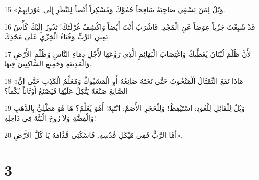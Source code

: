\par 15 «وَيْلٌ لِمَنْ يَسْقِي صَاحِبَهُ سَافِحاً حُمُوَّكَ وَمُسْكِراً أَيْضاً لِلنَّظَرِ إِلَى عَوْرَاتِهِمْ.
\par 16 قَدْ شَبِعْتَ خِزْياً عِوَضاً عَنِ الْمَجْدِ. فَاشْرَبْ أَنْتَ أَيْضاً وَاكْشِفْ غُرْلَتَكَ! تَدُورُ إِلَيْكَ كَأْسُ يَمِينِ الرَّبِّ وَقُيَاءُ الْخِزْيِ عَلَى مَجْدِكَ.
\par 17 لأَنَّ ظُلْمَ لُبْنَانَ يُغَطِّيكَ وَاغْتِصَابَ الْبَهَائِمِ الَّذِي رَوَّعَهَا لأَجْلِ دِمَاءِ النَّاسِ وَظُلْمِ الأَرْضِ وَالْمَدِينَةِ وَجَمِيعِ السَّاكِنِينَ فِيهَا.
\par 18 «مَاذَا نَفَعَ التِّمْثَالُ الْمَنْحُوتُ حَتَّى نَحَتَهُ صَانِعُهُ أَوِ الْمَسْبُوكُ وَمُعَلِّمُ الْكَذِبِ حَتَّى إِنَّ الصَّانِعَ صَنْعَةً يَتَّكِلُ عَلَيْهَا فَيَصْنَعُ أَوْثَاناً بُكْماً؟
\par 19 وَيْلٌ لِلْقَائِلِ لِلْعُودِ: اسْتَيْقِظْ! وَلِلْحَجَرِ الأَصَمِّ: انْتَبِهْ! أَهُوَ يُعَلِّمُ؟ هَا هُوَ مَطْلِيٌّ بِالذَّهَبِ وَالْفِضَّةِ وَلاَ رُوحَ الْبَتَّةَ فِي دَاخِلِهِ!
\par 20 أَمَّا الرَّبُّ فَفِي هَيْكَلِ قُدْسِهِ. فَاسْكُتِي قُدَّامَهُ يَا كُلَّ الأَرْضِ».

\chapter{3}

